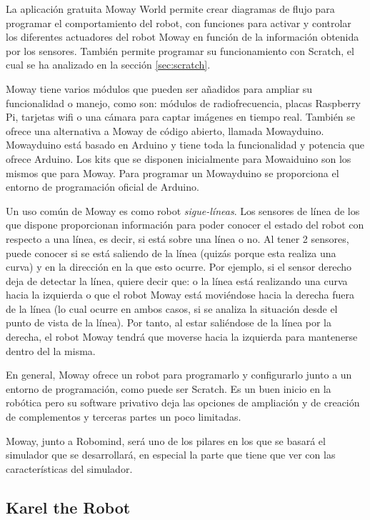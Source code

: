 La aplicación gratuita Moway World permite crear diagramas de flujo para programar el comportamiento del robot, con funciones para activar y controlar los diferentes actuadores del robot Moway en función de la información obtenida por los sensores. También permite programar su funcionamiento con Scratch, el cual se ha analizado en la sección \ref{sec:scratch}. 

Moway tiene varios módulos que pueden ser añadidos para ampliar su funcionalidad o manejo, como son: módulos de radiofrecuencia, placas Raspberry Pi, tarjetas wifi o una cámara para captar imágenes en tiempo real. También se ofrece una alternativa a Moway de código abierto, llamada Mowayduino. Mowayduino está basado en Arduino y tiene toda la funcionalidad y potencia que ofrece Arduino. Los kits que se disponen inicialmente para Mowaiduino son los mismos que para Moway. Para programar un Mowayduino se proporciona el entorno de programación oficial de Arduino.


Un uso común de Moway es como robot \emph{sigue-líneas}. Los sensores de línea de los que dispone proporcionan información para poder conocer el estado del robot con respecto a una línea, es decir, si está sobre una línea o no. Al tener 2 sensores, puede conocer si se está saliendo de la línea (quizás porque esta realiza una curva) y en la dirección en la que esto ocurre. Por ejemplo, si el sensor derecho deja de detectar la línea, quiere decir que: o la línea está realizando una curva hacia la izquierda o que el robot Moway está moviéndose hacia la derecha fuera de la línea (lo cual ocurre en ambos casos, si se analiza la situación desde el punto de vista de la línea). Por tanto, al estar saliéndose de la línea por la derecha, el robot Moway tendrá que moverse hacia la izquierda para mantenerse dentro del la misma. 


En general, Moway ofrece un robot para programarlo y configurarlo junto a un entorno de programación, como puede ser Scratch. Es un buen inicio en la robótica pero su software privativo deja las opciones de ampliación y de creación de complementos y terceras partes un poco limitadas.

Moway, junto a Robomind, será uno de los pilares en los que se basará el simulador que se desarrollará, en especial la parte que tiene que ver con las características del simulador.



\subsection{Karel the Robot}
\label{sec:karel-the-robot}


